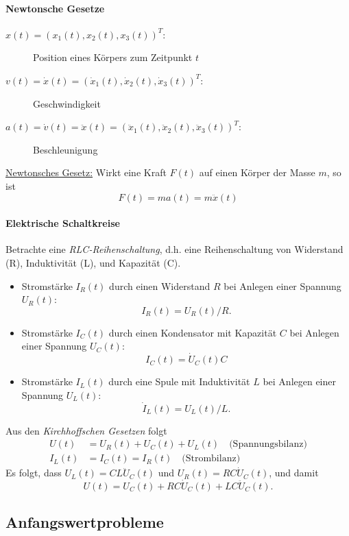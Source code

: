 \documentclass[
]{mycourse}
\theoremstyle{mythm}
\theoremstyle{break}
\begin{document}
\paragraph{Newtonsche Gesetze}

\begin{description}
\item[$x(t)=(x_1(t), x_2(t), x_3(t))^T$:] Position eines Körpers zum Zeitpunkt $t$ 
\item[$v(t)=\dot x(t)=(\dot x_1(t), \dot x_2(t), \dot x_3(t))^T$:] Geschwindigkeit
\item[$a(t)=\dot v(t)=  \ddot x(t)=(\ddot x_1(t), \ddot x_2(t), \ddot x_3(t))^T$:] Beschleunigung
\end{description}

\underline{Newtonsches Gesetz:} Wirkt eine Kraft $F(t)$ auf einen Körper der Masse $m$, so ist
\[
F(t)= m a(t) = m \ddot x(t)
\]
%
\paragraph{Elektrische Schaltkreise}

Betrachte eine \emph{RLC-Reihenschaltung}, d.h. eine Reihenschaltung von Widerstand (R), 
Induktivität (L), und Kapazität (C). 
\begin{itemize}
\item Stromstärke $I_R(t)$ durch einen Widerstand $R$ bei Anlegen einer Spannung $U_R(t)$:
\[
I_R(t)= U_R(t) / R.
\]
\item Stromstärke $I_C(t)$ durch einen Kondensator mit Kapazität $C$ bei Anlegen einer Spannung $U_C(t)$:
\[
I_C(t)= \dot U_C(t) C 
\]
\item Stromstärke $I_L(t)$ durch eine Spule mit Induktivität $L$ bei Anlegen einer Spannung
$U_L(t)$:
\[
\dot I_L(t)= U_L(t)/L.
\]
\end{itemize}

Aus den \emph{Kirchhoffschen Gesetzen} folgt
\begin{align*}
U(t)&=U_R(t)+U_C(t)+U_L(t) \quad \mbox{(Spannungsbilanz)}\\
I_L(t)&=I_C(t)=I_R(t) \quad \mbox{(Strombilanz)}
\end{align*}
Es folgt, dass $U_L(t)=C L \ddot U_C(t)$ und $U_R(t)=R C \dot U_C(t)$, und damit
\[
U(t)=U_C(t)+RC\dot U_C(t) + LC \ddot U_C(t).
\]


\subsection{Anfangswertprobleme}
\end{document}
